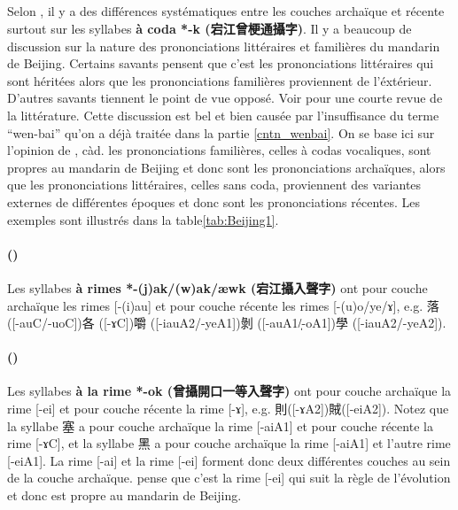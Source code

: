 \documentclass{scrbook}
\newcounter{c}[subsubsection]
\newcommand{\stpc}[1]{\stepcounter{#1}}
\newcommand{\difwenbai}{couches archaïque et récente\xspace}
\newcommand{\illustre}{Les exemples sont illustrés dans la table\xspace}
\newcommand{\termyyx}[1]{\textbf{#1}}
\begin{document}
\begin{sloppypar}
\subsection{\MakeCapital{\difwenbai}}
Selon \textcite[111--115]{Zhang2010beijing}, il y a des différences systématiques entre les \difwenbai surtout sur les syllabes \termyyx{à coda *-k (宕江曾梗通攝字)}. Il y a beaucoup de discussion sur la nature des prononciations littéraires et familières du mandarin de Beijing. Certains savants pensent que c'est les prononciations littéraires qui sont héritées alors que les prononciations familières proviennent de l'éxtérieur. D'autres savants tiennent le point de vue opposé. Voir \textcite[124--125]{Zhang2010beijing} pour une courte revue de la littérature. Cette discussion est bel et bien causée par l'insuffisance du terme ``wen-bai'' qu'on a déjà traitée dans la partie \ref{cntn_wenbai}. On se base ici sur l'opinion de \textcite[125]{Zhang2010beijing}, càd. les prononciations familières, celles à codas vocaliques, sont propres au mandarin de Beijing et donc sont les prononciations archaïques, alors que les prononciations littéraires, celles sans coda, proviennent des variantes externes de différentes époques et donc sont les prononciations récentes. \illustre \ref{tab:Beijing1}.

\stpc{c}\paragraph{()}
Les syllabes \termyyx{à rimes *-(j)ak/(w)ak/æwk (宕江攝入聲字)} ont pour couche archaïque les rimes [-(i)au] et pour couche récente les rimes [-(u)o/ye/ɤ], e.g. 落 ([-auC/-uoC])各 ([-ɤC])嚼 ([-iauA2/-yeA1])剝 ([-auA1/̩-oA1])學 ([-iauA2/-yeA2]).

\stpc{c}\paragraph{()}
Les syllabes \termyyx{à la rime *-ok (曾攝開口一等入聲字)} ont pour couche archaïque la rime [-ei] et pour couche récente la rime [-ɤ], e.g. 則([-ɤA2])賊([-eiA2]). Notez que la syllabe 塞 a pour couche archaïque la rime [-aiA1] et pour couche récente la rime [-ɤC], et la syllabe 黑 a pour couche archaïque la rime [-aiA1] et l'autre rime [-eiA1]. La rime [-ai] et la rime [-ei] forment donc deux différentes couches au sein de la couche archaïque. \textcite[113]{Zhang2010beijing} pense que c'est la rime [-ei] qui suit la règle de l'évolution et donc est propre au mandarin de Beijing.


\end{sloppypar}
\end{document}
